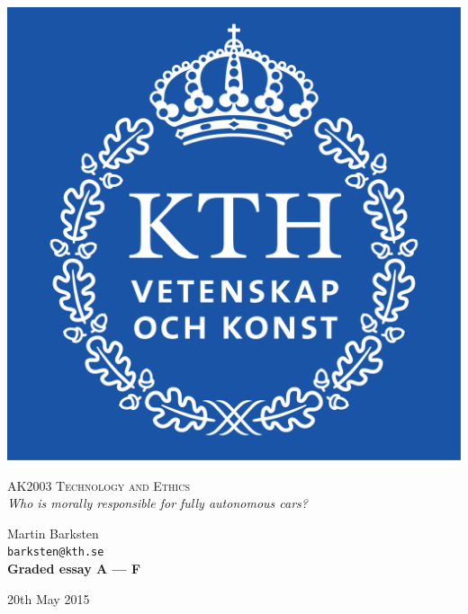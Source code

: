\begin{titlepage}
\begin{center}
    \includegraphics[scale=0.4]{Images/KTH_Logotyp.png}
    \vspace{2cm}

    \textsc{\LARGE AK2003 Technology and Ethics}\\[0.2cm]
    \Large \textit{Who is morally responsible for fully autonomous cars?}\\[0.3cm]

    \noindent
    \begin{table}[h!]
        \centering
        \large
        Martin Barksten\\
        \texttt{barksten@kth.se}\\
        \textbf{Graded essay A --- F}
    \end{table}

    \vfill

    {\large 20th May 2015} %

\end{center}
\end{titlepage}